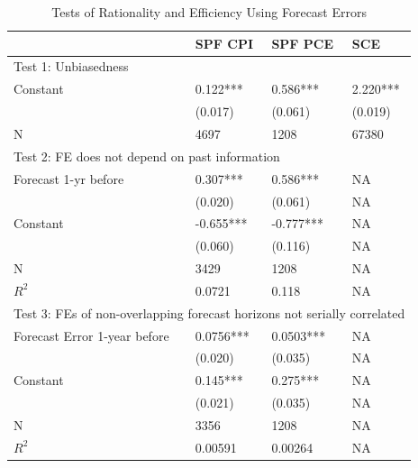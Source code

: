 \documentclass[12pt]{article}
\begin{document}
	\begin{table}[ht]
		\caption{Tests of Rationality and Efficiency Using Forecast Errors}
		\label{NullTestTable}
		\centering 
		\begin{tabular}{llll}
			\hline 
			& SPF CPI          & SPF PCE          & SCE            \\
			\hline 
			\multicolumn{4}{l}{Test 1: Unbiasedness}                                                           \\
			\hline 
			Constant                            & 0.122***         & 0.586***         & 2.220***       \\
			& (0.017)          & (0.061)          & (0.019)        \\
			\hline 
			N                                   & 4697             & 1208             & 67380          \\
			\hline 
			\multicolumn{4}{l}{Test 2: FE does not depend on past information}                                  \\
			\hline 
			Forecast 1-yr before                & 0.307***         & 0.586***         & NA             \\
			& (0.020)          & (0.061)          & NA             \\
			Constant                            & -0.655***        & -0.777***        & NA             \\
			& (0.060)          & (0.116)          & NA             \\
			\hline 
			N                                   & 3429             & 1208             & NA             \\
			$R^2$                 & 0.0721           & 0.118            & NA             \\
			\hline 
			\multicolumn{4}{l}{Test 3: FEs of non-overlapping forecast horizons not serially correlated} \\
			\hline 
			Forecast Error 1-year before        & 0.0756***        & 0.0503***        & NA             \\
			& (0.020)          & (0.035)          & NA             \\
			Constant                            & 0.145***         & 0.275***         & NA             \\
			& (0.021)          & (0.035)          & NA             \\
			\hline 
			N                                   & 3356             & 1208             & NA             \\
			$R^2$                   & 0.00591          & 0.00264          & NA             \\

\end{tabular}
\end{table}
\end{document}
